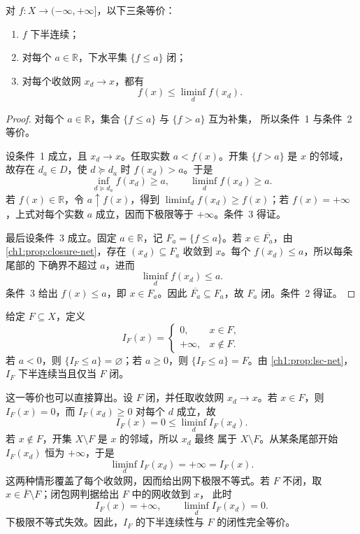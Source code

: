 \begin{proposition}[下半连续的闭集与网判据]
对 \(f\colon X\to(-\infty,+\infty]\)，以下三条等价：
\begin{enumerate}
  \item \(f\) 下半连续；
  \item 对每个 \(a\in\mathbb R\)，下水平集 \(\{f\leq a\}\) 闭；
  \item 对每个收敛网 \(x_d\to x\)，都有
        \[
        f(x)\leq\liminf_d f(x_d).
        \]
\end{enumerate}
\label{ch1:prop:lsc-net}
\end{proposition}

\begin{proof}
对每个 \(a\in\mathbb R\)，集合 \(\{f\leq a\}\) 与 \(\{f>a\}\) 互为补集，
所以条件~1 与条件~2 等价。

设条件~1 成立，且 \(x_d\to x\)。任取实数 \(a<f(x)\)。开集 \(\{f>a\}\)
是 \(x\) 的邻域，故存在 \(d_a\in D\)，使 \(d\succeq d_a\) 时
\(f(x_d)>a\)。于是
\[
 \inf_{d\succeq d_a}f(x_d)\geq a,
 \qquad
 \liminf_d f(x_d)\geq a.
\]
若 \(f(x)\in\mathbb R\)，令 \(a\uparrow f(x)\)，得到
\(\liminf_df(x_d)\geq f(x)\)；若 \(f(x)=+\infty\)，上式对每个实数 \(a\)
成立，因而下极限等于 \(+\infty\)。条件~3 得证。

最后设条件~3 成立。固定 \(a\in\mathbb R\)，记 \(F_a=\{f\leq a\}\)。若
\(x\in\overline{F_a}\)，由 \cref{ch1:prop:closure-net}，存在
\((x_d)\subseteq F_a\) 收敛到 \(x\)。每个 \(f(x_d)\leq a\)，所以每条尾部的
下确界不超过 \(a\)，进而
\[
 \liminf_d f(x_d)\leq a.
\]
条件~3 给出 \(f(x)\leq a\)，即 \(x\in F_a\)。因此
\(\overline{F_a}\subseteq F_a\)，故 \(F_a\) 闭。条件~2 得证。
\end{proof}

\begin{example}[闭约束产生的扩展实值能量]
给定 \(F\subseteq X\)，定义
\[
 I_F(x)=
 \begin{cases}
 0,&x\in F,\\
 +\infty,&x\notin F.
 \end{cases}
\]
若 \(a<0\)，则 \(\{I_F\leq a\}=\varnothing\)；若 \(a\geq0\)，则
\(\{I_F\leq a\}=F\)。由 \cref{ch1:prop:lsc-net}，\(I_F\) 下半连续当且仅当
\(F\) 闭。

这一等价也可以直接算出。设 \(F\) 闭，并任取收敛网 \(x_d\to x\)。若
\(x\in F\)，则 \(I_F(x)=0\)，而 \(I_F(x_d)\geq0\) 对每个 \(d\) 成立，故
\[
 I_F(x)=0\leq\liminf_d I_F(x_d).
\]
若 \(x\notin F\)，开集 \(X\setminus F\) 是 \(x\) 的邻域，所以 \(x_d\) 最终
属于 \(X\setminus F\)。从某条尾部开始 \(I_F(x_d)\) 恒为 \(+\infty\)，于是
\[
 \liminf_d I_F(x_d)=+\infty=I_F(x).
\]
这两种情形覆盖了每个收敛网，因而给出网下极限不等式。若 \(F\) 不闭，取
\(x\in\overline F\setminus F\)；闭包网判据给出 \(F\) 中的网收敛到 \(x\)，
此时
\[
 I_F(x)=+\infty,
 \qquad
 \liminf_d I_F(x_d)=0.
\]
下极限不等式失效。因此，$I_F$ 的下半连续性与 $F$ 的闭性完全等价。
\end{example}

